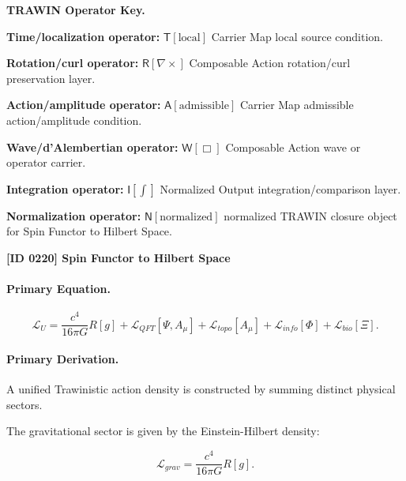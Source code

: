 \par\vspace{0.45\baselineskip}
\noindent\begin{minipage}[t]{\linewidth}
\begingroup
\small
\raggedright
\textbf{TRAWIN Operator Key.}\par
\noindent\textbf{Time/localization operator:} $\mathsf{T}\!\left[\mathrm{local}\right]$ Carrier Map local source condition.\par
\noindent\textbf{Rotation/curl operator:} $\mathsf{R}\!\left[\nabla\times\right]$ Composable Action rotation/curl preservation layer.\par
\noindent\textbf{Action/amplitude operator:} $\mathsf{A}\!\left[\mathrm{admissible}\right]$ Carrier Map admissible action/amplitude condition.\par
\noindent\textbf{Wave/d'Alembertian operator:} $\mathsf{W}\!\left[\Box\right]$ Composable Action wave or operator carrier.\par
\noindent\textbf{Integration operator:} $\mathsf{I}\!\left[\int\right]$ Normalized Output integration/comparison layer.\par
\noindent\textbf{Normalization operator:} $\mathsf{N}\!\left[\mathrm{normalized}\right]$ normalized TRAWIN closure object for Spin Functor to Hilbert Space.\par
\endgroup
\end{minipage}

\clearpage
\noindent\textbf{[ID 0220] Spin Functor to Hilbert Space}\par
\vspace{0.35em}
\paragraph{Primary Equation.}
\begin{equation}
\mathcal{L}_U
=
\frac{c^4}{16\pi G}R[g]
+
\mathcal{L}_{QFT}[\Psi,A_\mu]
+
\mathcal{L}_{topo}[A_\mu]
+
\mathcal{L}_{info}[\Phi]
+
\mathcal{L}_{bio}[\Xi].
\end{equation}

\paragraph{Primary Derivation.}
A unified Trawinistic action density is constructed by summing distinct physical sectors.

The gravitational sector is given by the Einstein-Hilbert density:

\begin{equation}
\mathcal{L}_{grav}
=
\frac{c^4}{16\pi G}R[g].
\end{equation}

